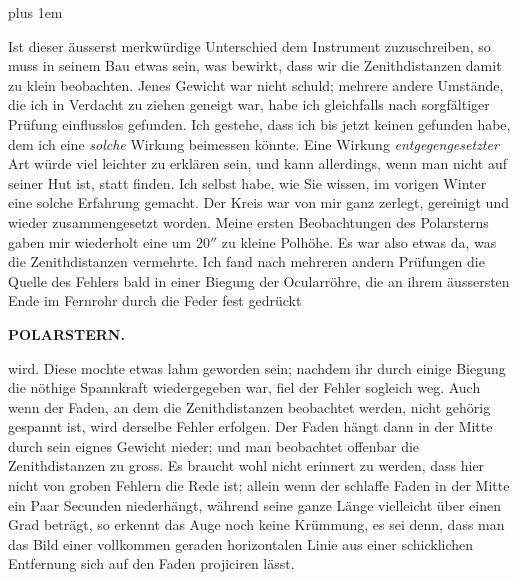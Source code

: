 {\rightskip=0pt plus 1em \par\indent Ist dieser äusserst merkwürdige Unterschied dem Instrument zu\-zuschreiben, so muss in seinem Bau etwas sein, was bewirkt, dass wir die Zenithdistanzen damit zu klein beobachten. Jenes Gewicht war nicht schuld; mehrere andere Umstände, die ich in Verdacht zu ziehen geneigt war, habe ich gleichfalls nach sorgfältiger Prüfung einflusslos gefunden. Ich gestehe, dass ich bis jetzt keinen gefunden habe, dem ich eine \emph{solche} Wirkung beimessen könnte. Eine Wirkung \emph{entgegengesetzter} Art würde viel leichter zu erklären sein, und kann allerdings, wenn man nicht auf seiner Hut ist, statt finden. Ich selbst habe, wie Sie wissen, im vorigen Winter eine solche Erfahrung gemacht. Der Kreis war von mir ganz zerlegt, gereinigt und wieder zusammengesetzt worden. Meine ersten Beobachtungen des Polarsterns gaben mir wiederholt eine um $20''$ zu kleine Polhöhe. Es war also etwas da, was die Zenithdistanzen vermehrte. Ich fand nach mehreren andern Prüfungen die Quelle des Fehlers bald in einer Biegung der Ocularröhre, die an ihrem äussersten Ende im Fernrohr durch die Feder fest gedrückt
\par
\clearpage
\thispagestyle{empty}
\noindent{}%
\makebox[12mm][l]{}%
\parbox[t]{\dimexpr\linewidth-24mm\relax}{\centering\footnotesize\bfseries POLARSTERN.\par}%
\par\nobreak\medskip
\noindent wird. Diese mochte etwas lahm geworden sein; nachdem ihr durch einige Biegung die nöthige Spannkraft wiedergegeben war, fiel der Fehler sogleich weg. Auch wenn der Faden, an dem die Zenithdistanzen beobachtet werden, nicht gehörig gespannt ist, wird derselbe Fehler erfolgen. Der Faden hängt dann in der Mitte durch sein eignes Gewicht nieder; und man beobachtet offenbar die Zenithdistanzen zu gross. Es braucht wohl nicht erinnert zu werden, dass hier nicht von groben Fehlern die Rede ist; allein wenn der schlaffe Faden in der Mitte ein Paar Secunden niederhängt, während seine ganze Länge vielleicht über einen Grad beträgt, so erkennt das Auge noch keine Krümmung, es sei denn, dass man das Bild einer vollkommen geraden horizontalen Linie aus einer schicklichen Entfernung sich auf den Faden projiciren lässt.\par}


